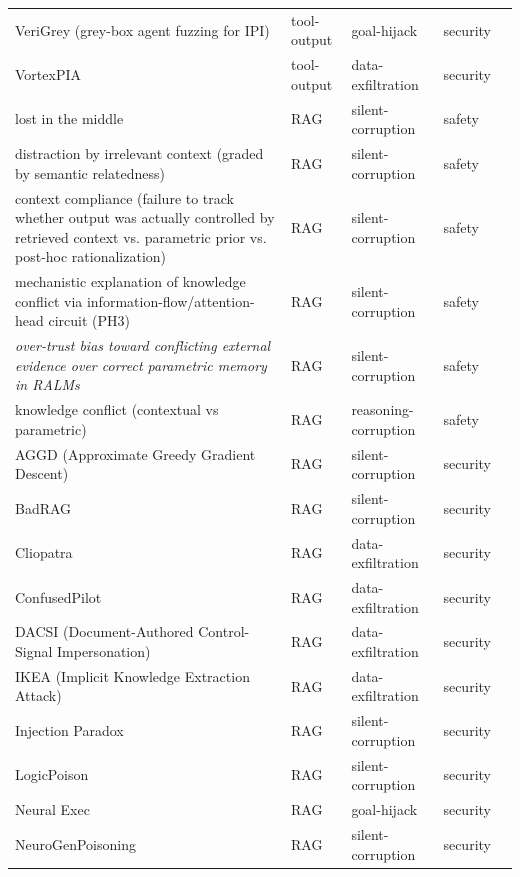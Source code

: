 \begin{longtable}{@{}p{}llll@{}}
VeriGrey (grey-box agent fuzzing for IPI) & tool-output & goal-hijack & security & \cite{zhang-2026-verigrey} \\
VortexPIA & tool-output & data-exfiltration & security & \cite{cui-2025-vortexpia} \\
lost in the middle & RAG & silent-corruption & safety & \cite{liu-2023-lost} \\
distraction by irrelevant context (graded by semantic relatedness) & RAG & silent-corruption & safety & \cite{wu-2024-easily} \\
context compliance (failure to track whether output was actually controlled by retrieved context vs. parametric prior vs. post-hoc rationalization) & RAG & silent-corruption & safety & \cite{chen-2026-rag} \\
mechanistic explanation of knowledge conflict via information-flow/attention-head circuit (PH3) & RAG & silent-corruption & safety & \cite{jin-2024-cutting} \\
\emph{over-trust bias toward conflicting external evidence over correct parametric memory in RALMs} & RAG & silent-corruption & safety & \cite{jin-2024-tugofwar} \\
knowledge conflict (contextual vs parametric) & RAG & reasoning-corruption & safety & \cite{yuan-2024-discerning} \\
AGGD (Approximate Greedy Gradient Descent) & RAG & silent-corruption & security & \cite{su-2024-corpus} \\
BadRAG & RAG & silent-corruption & security & \cite{xue-2024-badrag} \\
Cliopatra & RAG & data-exfiltration & security & \cite{annamalai-2026-cliopatra} \\
ConfusedPilot & RAG & data-exfiltration & security & \cite{roychowdhury-2024-confusedpilot} \\
DACSI (Document-Authored Control-Signal Impersonation) & RAG & data-exfiltration & security & \cite{zhu-2026-documentauthored} \\
IKEA (Implicit Knowledge Extraction Attack) & RAG & data-exfiltration & security & \cite{wang-2025-silent} \\
Injection Paradox & RAG & silent-corruption & security & \cite{paeng-2026-injection} \\
LogicPoison & RAG & silent-corruption & security & \cite{xiao-2026-logicpoison} \\
Neural Exec & RAG & goal-hijack & security & \cite{pasquini-2024-neural} \\
NeuroGenPoisoning & RAG & silent-corruption & security & \cite{zhu-2025-neurogenpoisoning} \\

\end{longtable}
